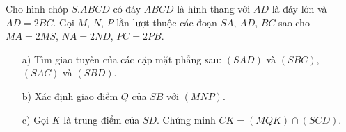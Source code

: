 \begin{bt}
	Cho hình chóp $ S.ABCD $ có đáy $ ABCD $ là hình thang với $ AD $ là đáy lớn và $ AD=2BC $. Gọi $ M $, $ N $, $ P $ lần lượt thuộc các đoạn $ SA $, $ AD $, $ BC $ sao cho $ MA=2MS $, $ NA=2ND $, $ PC=2PB $.
	\begin{itemize}
		\item[a)] Tìm giao tuyến của các cặp mặt phẳng sau: $ (SAD) $ và $ (SBC) $, $ (SAC) $ và $ (SBD) $.
		\item[b)] Xác định giao điểm $ Q $ của $ SB $ với $ (MNP) $.
		\item[c)] Gọi $ K $ là trung điểm của $ SD $. Chứng minh $ CK=(MQK)\cap (SCD) $.
	\end{itemize}
\end{bt}
